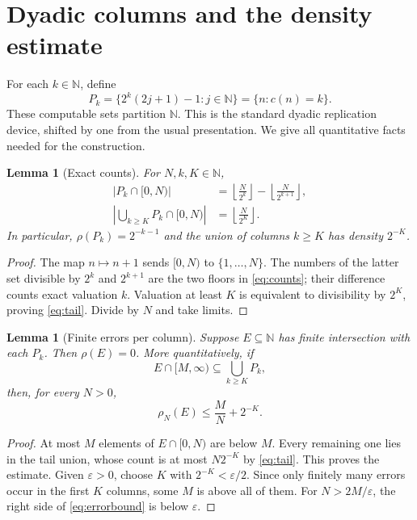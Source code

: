 \documentclass[11pt,a4paper]{article}
\newcommand{\N}{\mathbb N}
\newtheorem{lemma}[theorem]{Lemma}
\theoremstyle{definition}\newtheorem{definition}[theorem]{Definition}
\theoremstyle{remark}\newtheorem{remark}[theorem]{Remark}
\begin{document}
\section{Dyadic columns and the density estimate}
\label{sec:columns}
For each $k\in\N$, define
\[
 P_k=\{2^k(2j+1)-1:j\in\N\}=\{n:c(n)=k\}.
\]
These computable sets partition $\N$. This is the standard dyadic replication device, shifted by one from the usual presentation.\cite[Definition~2.7 and Theorem~2.19]{JS} We give all quantitative facts needed for the construction.

\begin{lemma}[Exact counts]\label{lem:counts}
For $N,k,K\in\N$,
\begin{align}
 |P_k\cap[0,N)|
   &=\left\lfloor\frac{N}{2^k}\right\rfloor
     -\left\lfloor\frac{N}{2^{k+1}}\right\rfloor,\label{eq:counts}\\
 \left|\bigcup_{k\geq K}P_k\cap[0,N)\right|
   &=\left\lfloor\frac{N}{2^K}\right\rfloor.\label{eq:tail}
\end{align}
In particular, $\rho(P_k)=2^{-k-1}$ and the union of columns $k\geq K$ has density $2^{-K}$.
\end{lemma}
\begin{proof}
The map $n\mapsto n+1$ sends $[0,N)$ to $\{1,\ldots,N\}$. The numbers of the latter set divisible by $2^k$ and $2^{k+1}$ are the two floors in \eqref{eq:counts}; their difference counts exact valuation $k$. Valuation at least $K$ is equivalent to divisibility by $2^K$, proving \eqref{eq:tail}. Divide by $N$ and take limits.
\end{proof}

\begin{lemma}[Finite errors per column]\label{lem:density}
Suppose $E\subseteq\N$ has finite intersection with each $P_k$. Then $\rho(E)=0$. More quantitatively, if
\[
 E\cap[M,\infty)\subseteq\bigcup_{k\geq K}P_k,
\]
then, for every $N>0$,
\begin{equation}\label{eq:errorbound}
 \rho_N(E)\leq \frac{M}{N}+2^{-K}.
\end{equation}
\end{lemma}
\begin{proof}
At most $M$ elements of $E\cap[0,N)$ are below $M$. Every remaining one lies in the tail union, whose count is at most $N2^{-K}$ by \eqref{eq:tail}. This proves the estimate. Given $\varepsilon>0$, choose $K$ with $2^{-K}<\varepsilon/2$. Since only finitely many errors occur in the first $K$ columns, some $M$ is above all of them. For $N>2M/\varepsilon$, the right side of \eqref{eq:errorbound} is below $\varepsilon$.
\end{proof}
\end{document}
